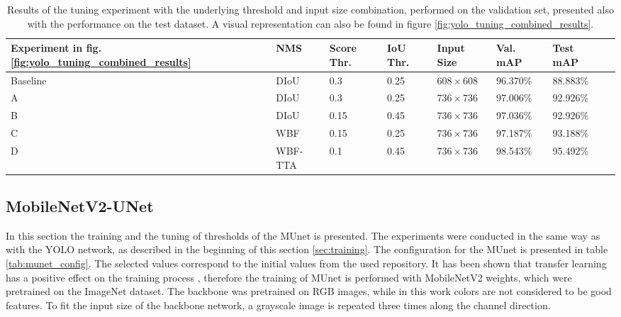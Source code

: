 \begin{table}[H]
\footnotesize
\begin{center}
\begin{tabular}{|l|l|l|l|l|l|l|l|}

\hline
\textbf{Experiment in fig. \ref{fig:yolo_tuning_combined_results}} & \textbf{NMS} & \textbf{Score Thr.} & \textbf{IoU Thr.} & \textbf{Input Size} & \textbf{Val. mAP} & \textbf{Test mAP}\\
\hline
Baseline & DIoU    & 0.3  & 0.25 & $608 \times 608$ & 96.370\% & 88.883\% \\
\hline
A        & DIoU    & 0.3  & 0.25 & $736 \times 736$ & 97.006\% & 92.926\% \\
\hline
B        & DIoU    & 0.15 & 0.45 & $736 \times 736$ & 97.036\% & 92.926\% \\
\hline
C        & WBF     & 0.15 & 0.25 & $736 \times 736$ & 97.187\% & 93.188\% \\
\hline
D        & WBF-TTA & 0.1  & 0.45 & $736 \times 736$ & \cellcolor{green}98.543\% & \cellcolor{green}95.492\% \\
\hline
\end{tabular}
\caption{Results of the tuning experiment with the underlying threshold and input size combination, performed on the validation set, presented also with the performance on the test dataset. A visual representation can also be found in figure \ref{fig:yolo_tuning_combined_results}.}
\label{tab:yolo_tuning_combined_results}
\end{center}
\end{table}




\subsection{MobileNetV2-UNet}
\label{sec:training_munet}

In this section the training and the tuning of thresholds of the \ac{MUnet} is presented.
The experiments were conducted in the same way as with the YOLO network, as described in the beginning of this section \ref{sec:training}.
The configuration for the \ac{MUnet} is presented in table \ref{tab:munet_config}.
The selected values correspond to the initial values from the used repository.
It has been shown that transfer learning has a positive effect on the training process \cite{mobile_unet}, therefore the training of \ac{MUnet} is performed with MobileNetV2 weights, which were pretrained on the ImageNet dataset.
The backbone was pretrained on RGB images, while in this work colors are not considered to be good features.
To fit the input size of the backbone network, a grayscale image is repeated three times along the channel direction.

